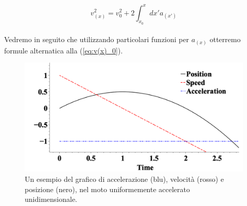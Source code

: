 \begin{equation}
    \boxed{\boxed{v^2_{(x)} = v_0^2 + 2\int_{x_0}^x dx'a_{(x')}}}
\label{eq:v(x)_gen}
\end{equation}
\\
Vedremo in seguito che utilizzando particolari funzioni per $a_{(x)}$ otterremo
formule alternatica alla (\ref{eq:v(x)_0}).
\begin{figure}[htbp]
\center
        \includegraphics[width=13cm]{images/MRUA.png} 
        \caption{Un esempio del grafico di accelerazione (blu), velocità
        (rosso) e posizione (nero), nel moto uniformemente accelerato
        unidimensionale.}       
\label{fig:MRUA}
\end{figure}
